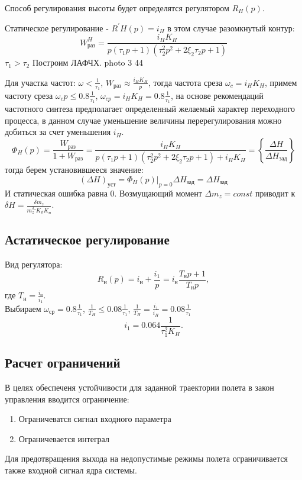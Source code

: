 \documentclass{article}
\begin{document}
Способ регулирования высоты будет определятся регулятором $R_H(p)$.

Статическое регулирование  - $R^{'}H(p) = i_H$ в этом случае разомкнутый контур:
\[
W_{раз}^H =\frac{i_H K_H}{p(\tau_1 p + 1)(\tau_2^2 p^2 + 2 \xi_2 \tau_2 p + 1)} 
\]
$\tau_1 > \tau_2$
Построим ЛАФЧХ. 
photo 3 44


Для участка частот:
$\omega < \frac{1}{\tau_1}$, $W_{раз} \approx \frac{i_H K_H }{p} $, тогда частота среза $\omega_c = i_H  K_H$, примем частоту среза $\omega_cp \le  0.8 \frac{1}{\tau_1}$, $\omega_{cp} = i_H K_H =0.8 \frac{1}{\tau_1} $, на основе рекомендаций частотного синтеза предполагает определенный желаемый характер переходного процесса, в данном случае уменьшение величины перерегулирования можно добиться за счет уменьшения $i_H$. 
\[
    \Phi_H (p) =\frac{W_{раз}}{1 + W_{раз}} =\frac{i_H K_H}{p(\tau_1 p +1)(\tau_2^2 p^2 + 2 \xi_2 \tau_2 p + 1) + i_H K_H} = \left\{ \frac{\Delta H}{\Delta H_{зад}} \right\}  
\]
тогда берем установившееся значение:
\[
(\Delta H)_{уст} = \Phi_H(p)|_{p=0} \Delta H_{зад} = \Delta H_{зад}
\]
И статическая ошибка равна 0. Возмущающий момент $\Delta m_z = const$ приводит к $\delta H =\frac{\delta m_z}{m_z^{\delta_н} K_\vartheta K_н}$.

\subsection{Астатическое регулирование}
Вид регулятора:
\[
R_н(p) = i_н +\frac{i_1}{p}  = i_н \frac{T_н p  + 1}{T_н p},
\]
где $T_н =\frac{i_н}{i_1}$.\\
Выбираем $\omega_{ср} = 0.8 \frac{1}{\tau_1}$, $\frac{1}{T_H} \le 0.08\frac{1}{\tau_1}$, $\frac{1}{T_H} = \frac{i_1}{i_H} = 0.08\frac{1}{\tau_1}$
\[
    i_1 = 0.064 \frac{1}{\tau_1^2 K_H}
.\]

\subsection{Расчет ограничений}
В целях обеспеченя устойчивости для заданной траектории полета в закон управления вводится ограничение:
\begin{enumerate}
    \item Ограничеватся сигнал входного параметра
    \item Ограничевается интеграл
\end{enumerate}

Для предотвращения выхода на недопустимые режимы полета ограничивается также входной сигнал ядра системы.
\end{document}
